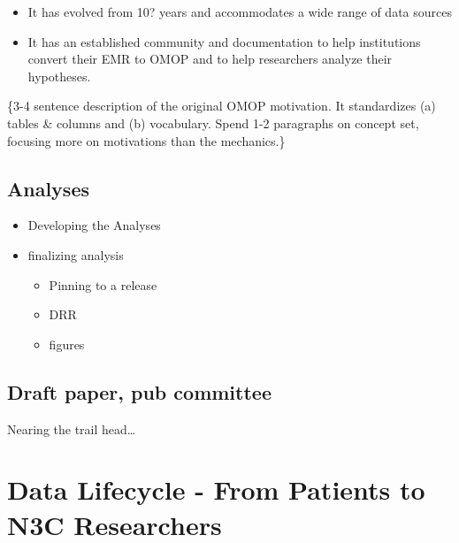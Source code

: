 \documentclass[
  letterpaper,
  DIV=11,
  numbers=noendperiod]{scrreprt}
\providecommand{\tightlist}{%
  \setlength{\itemsep}{0pt}\setlength{\parskip}{0pt}}\usepackage{longtable,booktabs,array}
\begin{document}
\begin{itemize}
\tightlist
\item
  It has evolved from 10? years and accommodates a wide range of data
  sources
\item
  It has an established community and documentation to help institutions
  convert their EMR to OMOP and to help researchers analyze their
  hypotheses.
\end{itemize}

\{3-4 sentence description of the original OMOP motivation. It
standardizes (a) tables \& columns and (b) vocabulary. Spend 1-2
paragraphs on concept set, focusing more on motivations than the
mechanics.\}

\hypertarget{analyses}{%
\section{Analyses}\label{analyses}}

\begin{itemize}
\tightlist
\item
  Developing the Analyses
\item
  finalizing analysis

  \begin{itemize}
  \tightlist
  \item
    Pinning to a release
  \item
    DRR
  \item
    figures
  \end{itemize}
\end{itemize}

\hypertarget{draft-paper-pub-committee}{%
\section{Draft paper, pub committee}\label{draft-paper-pub-committee}}

\begin{tcolorbox}[enhanced jigsaw, rightrule=.15mm, colback=white, leftrule=.75mm, breakable, left=2mm, bottomtitle=1mm, opacityback=0, toprule=.15mm, colframe=quarto-callout-note-color-frame, titlerule=0mm, toptitle=1mm, coltitle=black, title={Voice of Sam Elliot}, bottomrule=.15mm, arc=.35mm, opacitybacktitle=0.6, colbacktitle=quarto-callout-note-color!10!white]

Nearing the trail head\ldots{}

\end{tcolorbox}

\hypertarget{sec-lifecycle}{%
\chapter{Data Lifecycle - From Patients to N3C
Researchers}\label{sec-lifecycle}}
\end{document}
